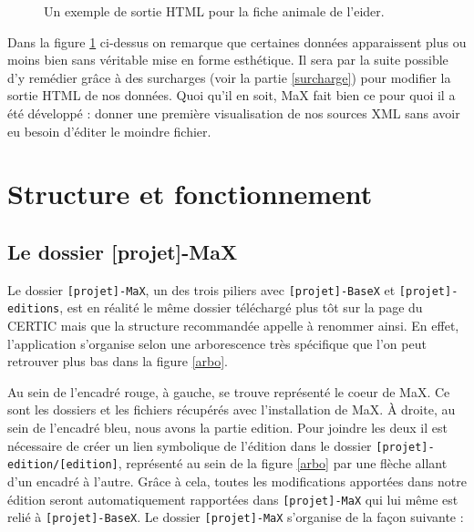 \documentclass[a4paper,12pt,twoside]{book}
\begin{document}
\begin{figure}[H]
    \centering
  \caption{Un exemple de sortie \acrshort{HTML} pour la fiche animale de l'eider.}
  \label{max-animal}
\end{figure}

Dans la figure \ref{max-animal} ci-dessus on remarque que certaines données apparaissent plus ou moins bien sans véritable mise en forme esthétique. Il sera par la suite possible d'y remédier grâce à des surcharges (voir la partie \ref{surcharge}) pour modifier la sortie \acrshort{HTML} de nos données. Quoi qu'il en soit, MaX fait bien ce pour quoi il a été développé : donner une première visualisation de nos sources XML sans avoir eu besoin d'éditer le moindre fichier. 


\chapter{Structure et fonctionnement}

\section{Le dossier [projet]-MaX}

Le dossier \texttt{[projet]-MaX}, un des trois piliers avec \texttt{[projet]-BaseX} et \texttt{[projet]-editions}, est en réalité le même dossier téléchargé plus tôt sur la page du \acrshort{CERTIC} mais que la structure recommandée appelle à renommer ainsi. En effet, l'application s'organise selon une arborescence très spécifique que l'on peut retrouver plus bas dans la figure \ref{arbo}.

Au sein de l'encadré rouge, à gauche, se trouve représenté le \og coeur de MaX\fg. Ce sont les dossiers et les fichiers récupérés avec l'installation de MaX. À droite, au sein de l'encadré bleu, nous avons la partie \og edition\fg. Pour joindre les deux il est nécessaire de créer un lien symbolique de l'édition dans le dossier \texttt{[projet]-edition/[edition]}, représenté au sein de la figure \ref{arbo} par une flèche allant d'un encadré à l'autre. Grâce à cela, toutes les modifications apportées dans notre édition seront automatiquement rapportées dans \texttt{[projet]-MaX} qui lui même est relié à \texttt{[projet]-BaseX}. Le dossier \texttt{[projet]-MaX} s'organise de la façon suivante :
\end{document}

